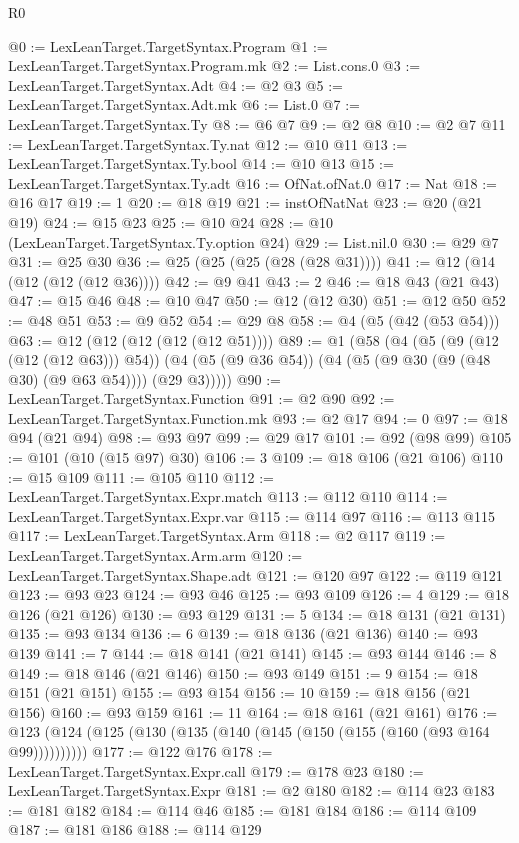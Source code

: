 \begin{lexlean}{R0}
\begin{coremodule}
@0 := LexLeanTarget.TargetSyntax.Program
@1 := LexLeanTarget.TargetSyntax.Program.mk
@2 := List.cons.{0}
@3 := LexLeanTarget.TargetSyntax.Adt
@4 := @2 @3
@5 := LexLeanTarget.TargetSyntax.Adt.mk
@6 := List.{0}
@7 := LexLeanTarget.TargetSyntax.Ty
@8 := @6 @7
@9 := @2 @8
@10 := @2 @7
@11 := LexLeanTarget.TargetSyntax.Ty.nat
@12 := @10 @11
@13 := LexLeanTarget.TargetSyntax.Ty.bool
@14 := @10 @13
@15 := LexLeanTarget.TargetSyntax.Ty.adt
@16 := OfNat.ofNat.{0}
@17 := Nat
@18 := @16 @17
@19 := 1
@20 := @18 @19
@21 := instOfNatNat
@23 := @20 (@21 @19)
@24 := @15 @23
@25 := @10 @24
@28 := @10 (LexLeanTarget.TargetSyntax.Ty.option @24)
@29 := List.nil.{0}
@30 := @29 @7
@31 := @25 @30
@36 := @25 (@25 (@25 (@28 (@28 @31))))
@41 := @12 (@14 (@12 (@12 (@12 @36))))
@42 := @9 @41
@43 := 2
@46 := @18 @43 (@21 @43)
@47 := @15 @46
@48 := @10 @47
@50 := @12 (@12 @30)
@51 := @12 @50
@52 := @48 @51
@53 := @9 @52
@54 := @29 @8
@58 := @4 (@5 (@42 (@53 @54)))
@63 := @12 (@12 (@12 (@12 (@12 @51))))
@89 := @1
    (@58
      (@4
        (@5 (@9 (@12 (@12 (@12 @63))) @54))
        (@4 (@5 (@9 @36 @54)) (@4 (@5 (@9 @30 (@9 (@48 @30) (@9 @63 @54)))) (@29 @3)))))
@90 := LexLeanTarget.TargetSyntax.Function
@91 := @2 @90
@92 := LexLeanTarget.TargetSyntax.Function.mk
@93 := @2 @17
@94 := 0
@97 := @18 @94 (@21 @94)
@98 := @93 @97
@99 := @29 @17
@101 := @92 (@98 @99)
@105 := @101 (@10 (@15 @97) @30)
@106 := 3
@109 := @18 @106 (@21 @106)
@110 := @15 @109
@111 := @105 @110
@112 := LexLeanTarget.TargetSyntax.Expr.match
@113 := @112 @110
@114 := LexLeanTarget.TargetSyntax.Expr.var
@115 := @114 @97
@116 := @113 @115
@117 := LexLeanTarget.TargetSyntax.Arm
@118 := @2 @117
@119 := LexLeanTarget.TargetSyntax.Arm.arm
@120 := LexLeanTarget.TargetSyntax.Shape.adt
@121 := @120 @97
@122 := @119 @121
@123 := @93 @23
@124 := @93 @46
@125 := @93 @109
@126 := 4
@129 := @18 @126 (@21 @126)
@130 := @93 @129
@131 := 5
@134 := @18 @131 (@21 @131)
@135 := @93 @134
@136 := 6
@139 := @18 @136 (@21 @136)
@140 := @93 @139
@141 := 7
@144 := @18 @141 (@21 @141)
@145 := @93 @144
@146 := 8
@149 := @18 @146 (@21 @146)
@150 := @93 @149
@151 := 9
@154 := @18 @151 (@21 @151)
@155 := @93 @154
@156 := 10
@159 := @18 @156 (@21 @156)
@160 := @93 @159
@161 := 11
@164 := @18 @161 (@21 @161)
@176 := @123 (@124 (@125 (@130 (@135 (@140 (@145 (@150 (@155 (@160 (@93 @164 @99))))))))))
@177 := @122 @176
@178 := LexLeanTarget.TargetSyntax.Expr.call
@179 := @178 @23
@180 := LexLeanTarget.TargetSyntax.Expr
@181 := @2 @180
@182 := @114 @23
@183 := @181 @182
@184 := @114 @46
@185 := @181 @184
@186 := @114 @109
@187 := @181 @186
@188 := @114 @129

\end{coremodule}
\end{lexlean}
